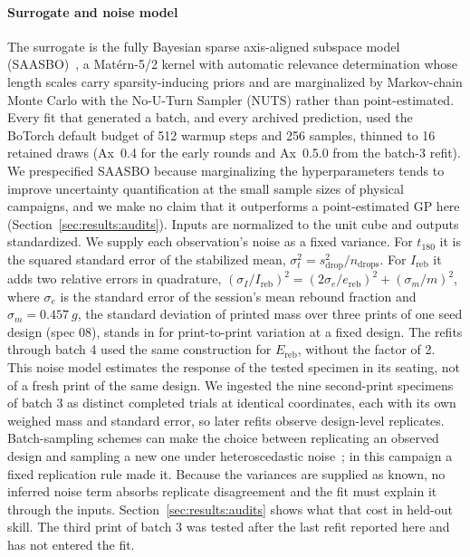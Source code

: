 \documentclass[11pt]{article}
\begin{document}
\paragraph{Surrogate and noise model} The surrogate is the fully
Bayesian sparse axis-aligned subspace model
(SAASBO)~\citep{eriksson2021saasbo}, a Mat\'ern-5/2 kernel with automatic
relevance determination whose length scales carry sparsity-inducing
priors and are marginalized by Markov-chain Monte Carlo with the
No-U-Turn Sampler (NUTS) rather than point-estimated. Every fit that
generated a batch, and every archived prediction, used the BoTorch
default budget of 512 warmup steps and 256 samples, thinned to 16
retained draws (Ax~0.4 for the early rounds and Ax~0.5.0 from the
batch-3 refit). We prespecified SAASBO because marginalizing the
hyperparameters tends to improve uncertainty quantification at the small
sample sizes of physical campaigns, and we make no claim that it
outperforms a point-estimated GP here (Section~\ref{sec:results:audits}).
Inputs are normalized to the unit cube and outputs standardized. We
supply each observation's noise as a fixed variance. For $t_{180}$ it is
the squared standard error of the stabilized mean,
$\sigma_t^2 = s_{\mathrm{drop}}^2 / n_{\mathrm{drops}}$. For
$I_{\mathrm{reb}}$ it adds two relative errors in quadrature,
$(\sigma_I/I_{\mathrm{reb}})^2 = (2\sigma_e/e_{\mathrm{reb}})^2 +
(\sigma_m/m)^2$, where $\sigma_e$ is the standard error of the session's
mean rebound fraction and $\sigma_m = \SI{0.457}{g}$, the standard
deviation of printed mass over three prints of one seed design (spec 08),
stands in for print-to-print variation at a fixed design. The refits
through batch 4 used the same construction for $E_{\mathrm{reb}}$,
without the factor of 2. This noise model estimates the response of the
tested specimen in its seating, not of a fresh print of the same design.
We ingested the nine second-print specimens of batch 3 as distinct
completed trials at identical coordinates, each with its own weighed mass
and standard error, so later refits observe design-level replicates.
Batch-sampling schemes can make the choice between replicating an
observed design and sampling a new one under heteroscedastic
noise~\citep{vanbeek2021batchnoise}; in this campaign a fixed replication
rule made it.
Because the variances are supplied as known, no inferred noise term
absorbs replicate disagreement and the fit must explain it through the
inputs. Section~\ref{sec:results:audits} shows what that cost in
held-out skill. The third print of batch 3 was tested after the last
refit reported here and has not entered the fit.
\end{document}
